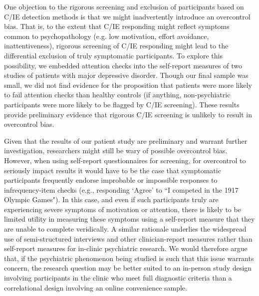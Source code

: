 \documentclass[a4paper,notitlepage,12pt]{article}
\begin{document}
\begin{refsection}[main]
One objection to the rigorous screening and exclusion of participants based on C/IE detection methods is that we might inadvertently introduce an overcontrol bias. That is, to the extent that C/IE responding might reflect symptoms common to psychopathology (e.g. low motivation, effort avoidance, inattentiveness), rigorous screening of C/IE responding might lead to the differential exclusion of truly symptomatic participants. To explore this possibility, we embedded attention checks into the self-report measures of two studies of patients with major depressive disorder. Though our final sample was small, we did not find evidence for the proposition that patients were more likely to fail attention checks than healthy controls (if anything, non-psychiatric participants were more likely to be flagged by C/IE screening). These results provide preliminary evidence that rigorous C/IE screening is unlikely to result in overcontrol bias.

Given that the results of our patient study are preliminary and warrant further investigation, researchers might still be wary of possible overcontrol bias. However, when using self-report questionnaires for screening, for overcontrol to seriously impact results it would have to be the case that symptomatic participants frequently endorse improbable or impossible responses to infrequency-item checks (e.g., responding `Agree' to ``I competed in the 1917 Olympic Games"). In this case, and even if such participants truly are experiencing severe symptoms of motivation or attention, there is likely to be limited utility in measuring these symptoms using a self-report measure that they are unable to complete veridically. A similar rationale underlies the widespread use of semi-structured interviews and other clinician-report measures rather than self-report measures for in-clinic psychiatric research. We would therefore argue that, if the psychiatric phenomenon being studied is such that this issue warrants concern, the research question may be better suited to an in-person study design involving participants in the clinic who meet full diagnostic criteria than a correlational design involving an online convenience sample.


\end{refsection}
\end{document}
